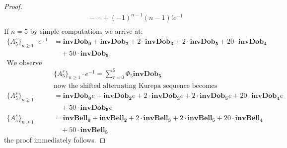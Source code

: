 \documentclass[pdflatex,sn-mathphys-num]{sn-jnl}%
\theoremstyle{thmstyleone}%
\theoremstyle{thmstyletwo}%
\theoremstyle{thmstylethree}%
\begin{document}
\begin{proof}
\begin{align*}
&\quad -\cdots+(-1)^{n-1}(n-1)!e^{-1}\\
\end{align*}
If $n=5$ by simple computations we arrive at:
\begin{align*}
\lbrace A_5^s\rbrace_{n\geq 1}\cdotp e^{-1}&=\mathbf{invDob_0} + \mathbf{invDob_2} + 2\cdotp \mathbf{invDob_3} +2\cdotp \mathbf{invDob_5} + 20\cdotp \mathbf{invDob_4} \\
&\quad + 50\cdotp \mathbf{invDob_{5}}.\\
\mbox{We observe that}\\
 &\lbrace A_5^s\rbrace_{n\geq 1}\cdotp e^{-1}=\sum_{r=0}^{5}\Phi_5 \mathbf{invDob_5}\\
 &\mbox{now the shifted alternating Kurepa sequence becomes}\\
\lbrace A_5^s\rbrace_{n\geq 1}&=\mathbf{invDob_0}e + \mathbf{invDob_2}e + 2\cdotp \mathbf{invDob_3}e +2\cdotp \mathbf{invDob_5}e + 20\cdotp \mathbf{invDob_4}e\\
&\quad   + 50\cdotp \mathbf{invDob_{5}}e\\
\lbrace A_5^s\rbrace_{n\geq 1}&=\mathbf{invBell_0} + \mathbf{invBell_2} + 2\cdotp \mathbf{invBell_3} +2\cdotp \mathbf{invBell_5} + 20\cdotp \mathbf{invBell_4} \\
&\quad   + 50\cdotp \mathbf{invBell_{5}}
\end{align*}
the proof immediately follows.
\end{proof}
\end{document}
